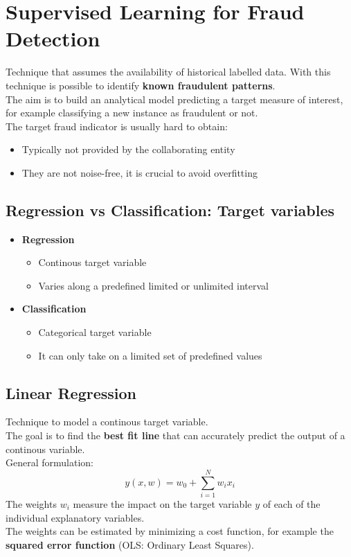 \section{Supervised Learning for Fraud Detection}
    Technique that assumes the availability of historical labelled data. With this technique is possible to identify \textbf{known fraudulent patterns}.\\
    The aim is to build an analytical model predicting a target measure of interest, for example classifying a new instance as fraudulent or not.\\
    The target fraud indicator is usually hard to obtain:
    \begin{itemize}
        \item Typically not provided by the collaborating entity
        \item They are not noise-free, it is crucial to avoid overfitting
    \end{itemize}
    \subsection{Regression vs Classification: Target variables}
    \begin{itemize}
        \item \textbf{Regression}
        \begin{itemize}
            \item Continous target variable
            \item Varies along a predefined limited or unlimited interval 
        \end{itemize}
        \item \textbf{Classification}
        \begin{itemize}
            \item Categorical target variable 
            \item It can only take on a limited set of predefined values
        \end{itemize}
    \end{itemize}
    \subsection{Linear Regression}
        Technique to model a continous target variable.\\
        The goal is to find the \textbf{best fit line} that can accurately predict the output of a continous variable.\\ 
        General formulation:
        $$y(x,w) = w_0 + \sum_{i=1}^{N}w_ix_i$$
        The weights $w_i$ measure the impact on the target variable $y$ of each of the individual explanatory variables.\\
        The weights can be estimated by minimizing a cost function, for example the \textbf{squared error function} (OLS: Ordinary Least Squares).
